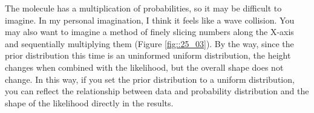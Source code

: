 \documentclass{ltjsbook}
\begin{document}
The molecule has a multiplication of probabilities, so it may be difficult to imagine. In my personal imagination, I think it feels like a wave collision. You may also want to imagine a method of finely slicing numbers along the X-axis and sequentially multiplying them (Figure \ref{fig::25_03}). By the way, since the prior distribution this time is an uninformed uniform distribution, the height changes when combined with the likelihood, but the overall shape does not change. In this way, if you set the prior distribution to a uniform distribution, you can reflect the relationship between data and probability distribution and the shape of the likelihood directly in the results.

\end{document}
